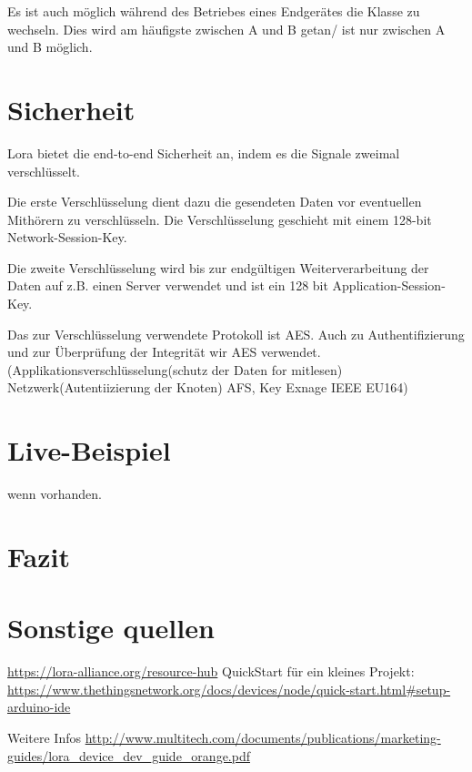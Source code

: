\documentclass[a4paper,12pt]{article}
\begin{document}
    Es ist auch möglich während des Betriebes eines Endgerätes die Klasse zu wechseln. Dies wird am häufigste zwischen A und B getan/ ist nur zwischen A und B möglich.
    \section{Sicherheit}
    Lora bietet die end-to-end Sicherheit an, indem es die Signale zweimal verschlüsselt.

    Die erste Verschlüsselung dient dazu die gesendeten Daten vor eventuellen Mithörern zu verschlüsseln. Die Verschlüsselung geschieht mit einem 128-bit Network-Session-Key.

    Die zweite Verschlüsselung wird bis zur endgültigen Weiterverarbeitung der Daten auf z.B. einen Server verwendet und ist ein 128 bit Application-Session-Key.

    Das zur Verschlüsselung verwendete Protokoll ist AES. Auch zu Authentifizierung und zur Überprüfung der Integrität wir AES verwendet.
    \cite{LoRaSecur}
        \cite{RFC8376}
        \cite{WhatIsLoRa}(Applikationsverschlüsselung(schutz der Daten for mitlesen) Netzwerk(Autentiizierung der Knoten) AFS, Key Exnage IEEE EU164)

    \section{Live-Beispiel}
    wenn vorhanden.

    \section{Fazit}
    \section{Sonstige quellen}
    \url{https://lora-alliance.org/resource-hub}
    QuickStart für ein kleines Projekt: \url{https://www.thethingsnetwork.org/docs/devices/node/quick-start.html#setup-arduino-ide}

    Weitere Infos \url{http://www.multitech.com/documents/publications/marketing-guides/lora_device_dev_guide_orange.pdf}
    \newpage
    
    
\end{document}
